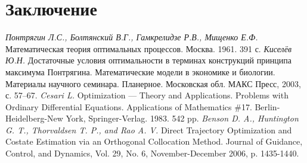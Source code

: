 \documentclass[12pt, a4paper]{article}
\begin{document}
\section{Заключение}

\begin{thebibliography}{30}

{\it Понтрягин Л.С., Болтянский В.Г., Гамкрелидзе Р.В., Мищенко Е.Ф.} Математическая теория оптимальных процессов. Москва. 1961. 391 с.
{\it Киселёв Ю.Н.} Достаточные условия оптимальности в терминах конструкций принципа максимума Понтрягина.
Математические модели в экономике и биологии. Материалы научного семинара. Планерное. Московская обл.
МАКС Пресс, 2003, с. 57--67.
{\it Cesari L.} Optimization — Theory and Applications. Problems with Ordinary Differential Equations. Applications of Mathematics \#17. Berlin-Heidelberg-New York, Springer-Verlag. 1983. 542 pp.
{\it Benson D. A., Huntington G. T., Thorvaldsen T. P., and Rao A. V.} Direct Trajectory Optimization and Costate Estimation via an Orthogonal Collocation Method. Journal of Guidance, Control, and Dynamics, Vol. 29, No. 6, November-December 2006, p. 1435-1440.
\end{thebibliography}
\end{document}
